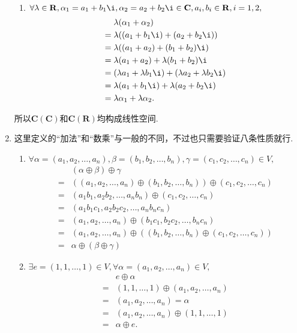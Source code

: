 \begin{solution}
\begin{enumerate}
\begin{enumerate}
                    \item $\forall \lambda \in \mathbf{R}, \alpha_1 = a_1+b_1\i, \alpha_2 = a_2+b_2\i \in \mathbf{C}, a_i, b_i \in \mathbf{R}, i = 1, 2,$
                    \begin{align*}
                        & \lambda(\alpha_1+\alpha_2) \\ ={} & \lambda((a_1+b_1\i)+(a_2+b_2\i)) \\ ={} & \lambda((a_1+a_2)+(b_1+b_2)\i) \\ ={} & \lambda(a_1+a_2)+\lambda(b_1+b_2)\i \\ ={} & (\lambda a_1+\lambda b_1\i)+(\lambda a_2+\lambda b_2\i) \\ ={} & \lambda(a_1+b_1\i)+\lambda(a_2+b_2\i) \\ ={} & \lambda \alpha_1 + \lambda \alpha_2.
                    \end{align*}
                \end{enumerate}
                所以$\mathbf{C}(\mathbf{C})$和$\mathbf{C}(\mathbf{R})$均构成线性空间.

                \item 这里定义的“加法”和“数乘”与一般的不同，不过也只需要验证八条性质就行.
                \begin{enumerate}
                    \item $\forall \alpha = (a_1, a_2, \ldots, a_n), \beta = (b_1, b_2, \ldots, b_n), \gamma = (c_1, c_2, \ldots, c_n) \in V, $
                    \begin{align*}
                        & (\alpha \oplus \beta) \oplus \gamma \\ ={} & ((a_1, a_2, \ldots, a_n)\oplus (b_1, b_2, \ldots, b_n)) \oplus (c_1, c_2, \ldots, c_n) \\ ={} & (a_1b_1, a_2b_2, \ldots, a_nb_n) \oplus (c_1, c_2, \ldots, c_n) \\ ={} & (a_1b_1c_1, a_2b_2c_2, \ldots, a_nb_nc_n) \\ ={} & (a_1, a_2, \ldots, a_n)\oplus (b_1c_1, b_2c_2, \ldots, b_nc_n) \\ ={} & (a_1, a_2, \ldots, a_n) \oplus ((b_1, b_2, \ldots, b_n) \oplus (c_1, c_2, \ldots, c_n)) \\ ={} & \alpha \oplus (\beta \oplus \gamma)
                    \end{align*}

                    \item $\exists e = (1, 1, \ldots , 1) \in V, \forall \alpha = (a_1, a_2, \ldots, a_n) \in V,$
                    \begin{align*}
                        & e \oplus \alpha \\ ={} & (1, 1, \ldots , 1) \oplus (a_1, a_2, \ldots, a_n) \\ ={} & (a_1, a_2, \ldots, a_n) = \alpha \\ ={} & (a_1, a_2, \ldots, a_n) \oplus (1, 1, \ldots , 1) \\ ={} & \alpha \oplus e.
                    \end{align*}


\end{enumerate}
\end{enumerate}
\end{solution}

